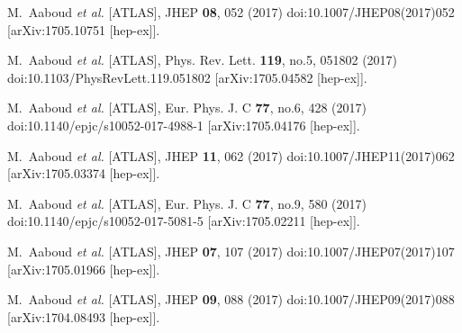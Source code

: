 \begin{thebibliography}{9}
M.~Aaboud \textit{et al.} [ATLAS],
JHEP \textbf{08}, 052 (2017)
doi:10.1007/JHEP08(2017)052
[arXiv:1705.10751 [hep-ex]].

M.~Aaboud \textit{et al.} [ATLAS],
Phys. Rev. Lett. \textbf{119}, no.5, 051802 (2017)
doi:10.1103/PhysRevLett.119.051802
[arXiv:1705.04582 [hep-ex]].

M.~Aaboud \textit{et al.} [ATLAS],
Eur. Phys. J. C \textbf{77}, no.6, 428 (2017)
doi:10.1140/epjc/s10052-017-4988-1
[arXiv:1705.04176 [hep-ex]].

M.~Aaboud \textit{et al.} [ATLAS],
JHEP \textbf{11}, 062 (2017)
doi:10.1007/JHEP11(2017)062
[arXiv:1705.03374 [hep-ex]].

M.~Aaboud \textit{et al.} [ATLAS],
Eur. Phys. J. C \textbf{77}, no.9, 580 (2017)
doi:10.1140/epjc/s10052-017-5081-5
[arXiv:1705.02211 [hep-ex]].

M.~Aaboud \textit{et al.} [ATLAS],
JHEP \textbf{07}, 107 (2017)
doi:10.1007/JHEP07(2017)107
[arXiv:1705.01966 [hep-ex]].

M.~Aaboud \textit{et al.} [ATLAS],
JHEP \textbf{09}, 088 (2017)
doi:10.1007/JHEP09(2017)088
[arXiv:1704.08493 [hep-ex]].


\end{thebibliography}
